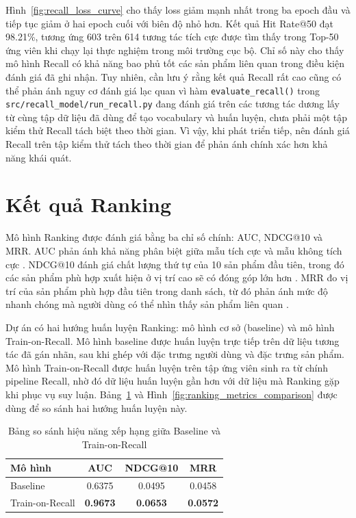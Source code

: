Hình~\ref{fig:recall_loss_curve} cho thấy loss giảm mạnh nhất trong ba epoch đầu và tiếp tục giảm ở hai epoch cuối với biên độ nhỏ hơn. Kết quả Hit Rate@50 đạt 98.21\%, tương ứng 603 trên 614 tương tác tích cực được tìm thấy trong Top-50 ứng viên khi chạy lại thực nghiệm trong môi trường cục bộ. Chỉ số này cho thấy mô hình Recall có khả năng bao phủ tốt các sản phẩm liên quan trong điều kiện đánh giá đã ghi nhận. Tuy nhiên, cần lưu ý rằng kết quả Recall rất cao cũng có thể phản ánh nguy cơ đánh giá lạc quan vì hàm \texttt{evaluate\_recall()} trong \texttt{src/recall\_model/run\_recall.py} đang đánh giá trên các tương tác dương lấy từ cùng tập dữ liệu đã dùng để tạo vocabulary và huấn luyện, chưa phải một tập kiểm thử Recall tách biệt theo thời gian. Vì vậy, khi phát triển tiếp, nên đánh giá Recall trên tập kiểm thử tách theo thời gian để phản ánh chính xác hơn khả năng khái quát.

\section{Kết quả Ranking}
Mô hình Ranking được đánh giá bằng ba chỉ số chính: AUC, NDCG@10 và MRR. AUC phản ánh khả năng phân biệt giữa mẫu tích cực và mẫu không tích cực \cite{fawcett2006roc}. NDCG@10 đánh giá chất lượng thứ tự của 10 sản phẩm đầu tiên, trong đó các sản phẩm phù hợp xuất hiện ở vị trí cao sẽ có đóng góp lớn hơn \cite{jarvelin2002cumulated}. MRR đo vị trí của sản phẩm phù hợp đầu tiên trong danh sách, từ đó phản ánh mức độ nhanh chóng mà người dùng có thể nhìn thấy sản phẩm liên quan \cite{craswell2009mrr}.
\medskip

Dự án có hai hướng huấn luyện Ranking: mô hình cơ sở (baseline) và mô hình Train-on-Recall. Mô hình baseline được huấn luyện trực tiếp trên dữ liệu tương tác đã gán nhãn, sau khi ghép với đặc trưng người dùng và đặc trưng sản phẩm. Mô hình Train-on-Recall được huấn luyện trên tập ứng viên sinh ra từ chính pipeline Recall, nhờ đó dữ liệu huấn luyện gần hơn với dữ liệu mà Ranking gặp khi phục vụ suy luận. Bảng~\ref{tab:ranking_comparison} và Hình~\ref{fig:ranking_metrics_comparison} được dùng để so sánh hai hướng huấn luyện này.

\begin{table}[H]
\centering
\caption{Bảng so sánh hiệu năng xếp hạng giữa Baseline và Train-on-Recall}
\label{tab:ranking_comparison}
\renewcommand{\arraystretch}{1.25}
\small
\begin{tabularx}{\textwidth}{Xccc}
\toprule
\textbf{Mô hình} & \textbf{AUC} & \textbf{NDCG@10} & \textbf{MRR} \\
\midrule
Baseline & 0.6375 & 0.0495 & 0.0458 \\
Train-on-Recall & \textbf{0.9673} & \textbf{0.0653} & \textbf{0.0572} \\
\bottomrule
\end{tabularx}
\end{table}

